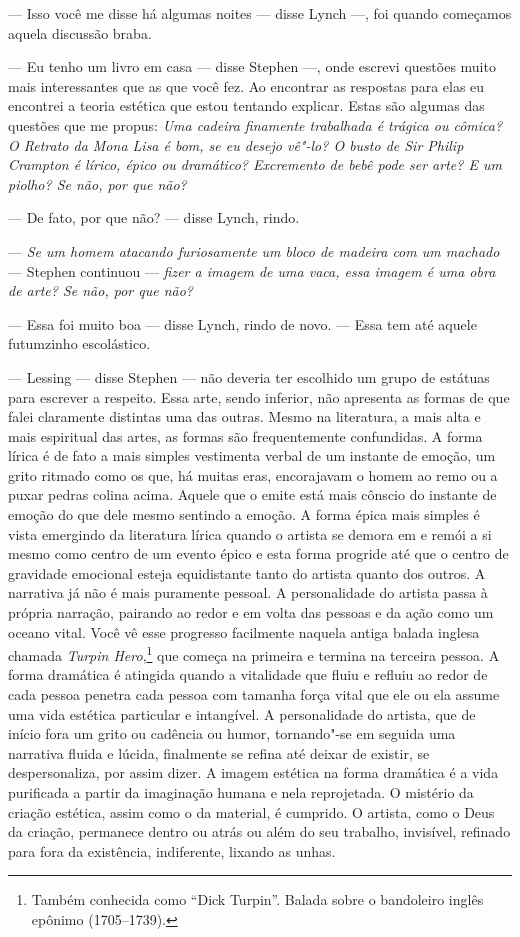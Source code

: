  --- Isso você me disse há algumas noites --- disse Lynch ---, foi quando
começamos aquela discussão braba.

 --- Eu tenho um livro em casa --- disse Stephen ---, onde escrevi questões muito
mais interessantes que as que você fez. Ao encontrar as respostas para
elas eu encontrei a teoria estética que estou tentando explicar. Estas
são algumas das questões que me propus: \textit{Uma cadeira finamente
trabalhada é trágica ou cômica? O Retrato da Mona Lisa é bom, se eu
desejo vê"-lo? O busto de Sir Philip Crampton é lírico, épico ou
dramático? Excremento de bebê pode ser arte? E um piolho? Se não, por
que não?}

 --- De fato, por que não? --- disse Lynch, rindo.

 --- \textit{Se um homem atacando furiosamente um bloco de madeira com um
machado} --- Stephen continuou ---  \textit{fizer a imagem de uma vaca, essa imagem é
uma obra de arte? Se não, por que não?}

 --- Essa foi muito boa --- disse Lynch, rindo de novo. --- Essa tem até aquele
futumzinho escolástico.

 --- Lessing --- disse Stephen --- não deveria ter escolhido um grupo de estátuas
para escrever a respeito. Essa arte, sendo inferior, não apresenta as
formas de que falei claramente distintas uma das outras. Mesmo na
literatura, a mais alta e mais espiritual das artes, as formas são
frequentemente confundidas. A forma lírica é de fato a mais simples
vestimenta verbal de um instante de emoção, um grito ritmado como os
que, há muitas eras, encorajavam o homem ao remo ou a puxar pedras
colina acima. Aquele que o emite está mais cônscio do instante de
emoção do que dele mesmo sentindo a emoção. A forma épica mais simples
é vista emergindo da literatura lírica quando o artista se demora em e
remói a si mesmo como centro de um evento épico e esta forma progride
até que o centro de gravidade emocional esteja equidistante tanto do
artista quanto dos outros. A narrativa já não é mais puramente pessoal.
A personalidade do artista passa à própria narração, pairando ao redor
e em volta das pessoas e da ação como um oceano vital. Você vê esse
progresso facilmente naquela antiga balada inglesa chamada
\textit{Turpin Hero},\footnote{ Também conhecida como ``Dick Turpin''. Balada
sobre o bandoleiro inglês epônimo (1705--1739).} que começa na primeira e
termina na terceira pessoa. A forma dramática é atingida quando a vitalidade que
fluiu e refluiu ao redor de cada pessoa penetra cada pessoa com tamanha força
vital que ele ou ela assume uma vida estética particular e intangível.  A
personalidade do artista, que de início fora um grito ou cadência ou humor,
tornando"-se em seguida uma narrativa fluida e lúcida, finalmente se refina até
deixar de existir, se despersonaliza, por assim dizer. A imagem estética na
forma dramática é a vida purificada a partir da imaginação humana e nela
reprojetada. O mistério da criação estética, assim como o da material, é
cumprido. O artista, como o Deus da criação, permanece dentro ou atrás ou além
do seu trabalho, invisível, refinado para fora da existência, indiferente,
lixando as unhas.

